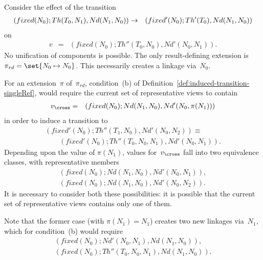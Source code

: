 \begin{example}
Consider the effect of the transition
\begin{eqnarray*}
(fixed(N_0); Th(T_0,N_1), Nd(N_1,N_0)) & \stackrel{}\rightarrow &
 (fixed'(N_0); Th'(T_0), Nd(N_1,N_0))
\end{eqnarray*}
on
\begin{eqnarray*}
v & = & (fixed(N_0); Th''(T_0,N_0), Nd'(N_0,N_1)).
\end{eqnarray*}
%
No unification of components is possible.  The only result-defining extension
is $\pi_{rd} = \set{{N_0 \mapsto N_0}}$.  This necessarily creates a linkage
via~$N_0$.  

For an extension~$\pi$ of~$\pi_{rd}$, condition~(b) of
Definition~\ref{def:induced-transition-singleRef}, would require the current
set of representative views to contain
%
\begin{eqnarray*}
v_\cross & = & (fixed(N_0); Nd(N_1,N_0), Nd'(N_0,\pi(N_1)))
\end{eqnarray*}
in order to induce a transition to
\[
\begin{align}
(fixed'(N_0); Th''(T_1,N_0),  Nd'(N_0,N_2)) \equiv \\
\qquad  (fixed'(N_0); Th''(T_0,N_0,N_1), Nd'(N_0,N_1)).
\end{align}
\]
Depending upon the value of $\pi(N_1)$, values for~$v_\cross$ fall into two
equivalence classes, with representative members
\[
\begin{align}
(fixed(N_0); Nd(N_1,N_0), Nd'(N_0,N_1)), \\
(fixed(N_0); Nd(N_1,N_0), Nd'(N_0,N_2)).
\end{align}
\]
It is necessary to consider both these possibilities: it is possible that the
current set of representative views contains only one of them.

Note that the former case (with $\pi(N_1) = N_1$) creates two new linkages
via~$N_1$, which for condition~(b) would require
\[
\begin{array}{c}
(fixed(N_0); Nd'(N_0,N_1), Nd(N_1,N_0)), \\
(fixed(N_0);Th''(T_0,N_0,N_1),Nd(N_1,N_0)).
\end{array}
\]
\end{example}



